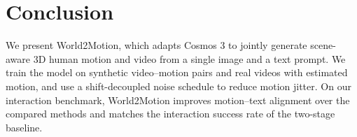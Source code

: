 \section{Conclusion}
\label{sec:conclusion}
We present World2Motion, which adapts Cosmos 3 to jointly generate scene-aware 3D human motion and video from a single image and a text prompt. We train the model on synthetic video--motion pairs and real videos with estimated motion, and use a shift-decoupled noise schedule to reduce motion jitter. On our interaction benchmark, World2Motion improves motion--text alignment over the compared methods and matches the interaction success rate of the two-stage baseline.
